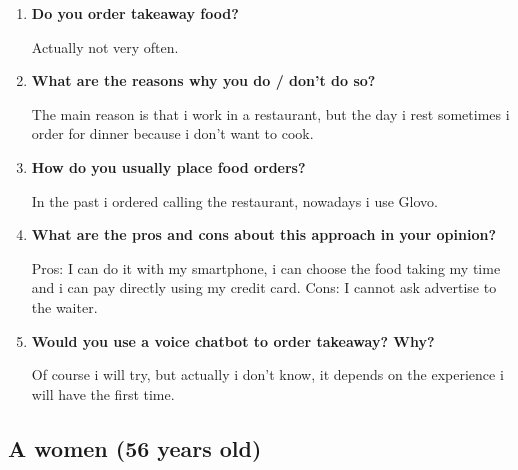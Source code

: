 \begin{enumerate}

\item \textbf{Do you order takeaway food?}

Actually not very often.

\item \textbf{What are the reasons why you do / don't do so?}

The main reason is that i work in a restaurant, but the day i rest sometimes i order for dinner because i don't want to cook.

\item \textbf{How do you usually place food orders?}

In the past i ordered calling the restaurant, nowadays i use Glovo.

\item \textbf{What are the pros and cons about this approach in your opinion?}

Pros: I can do it with my smartphone, i can choose the food taking my time and i can pay directly using my credit card.
Cons: I cannot ask advertise to the waiter.

\item \textbf{Would you use a voice chatbot to order takeaway? Why?}

Of course i will try, but actually i don't know, it depends on the experience i will have the first time.
\end{enumerate}



\subsection*{A women (56 years old)}

